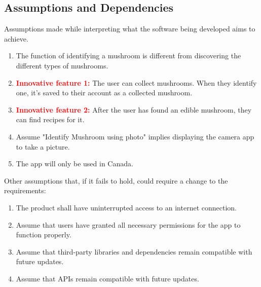 \documentclass[]{article}
\begin{document}

\subsection{Assumptions and Dependencies}
\label{sub:assumptions_and_dependencies}
Assumptions made while interpreting what the software being developed aims to achieve.
\begin{enumerate}
	\item The function of identifying a mushroom is different from discovering the different types of mushrooms.
	\item \textbf{\textcolor{red}{Innovative feature 1:}} The user can collect mushrooms. When they identify one, it's saved to their account as a collected mushroom.
	\item \textbf{\textcolor{red}{Innovative feature 2:}} After the user has found an edible mushroom, they can find recipes for it.
	\item Assume "Identify Mushroom using photo" implies displaying the camera app to take a picture.
	\item The app will only be used in Canada.
\end{enumerate}

Other assumptions that, if it fails to hold, could require a change to the requirements:
\begin{enumerate}
	\item The product shall have uninterrupted access to an internet connection.
    \item Assume that users have granted all necessary permissions for the app to function properly.
    \item Assume that third-party libraries and dependencies remain compatible with future updates.
    \item Assume that APIs remain compatible with future updates.
\end{enumerate}
\end{document}
